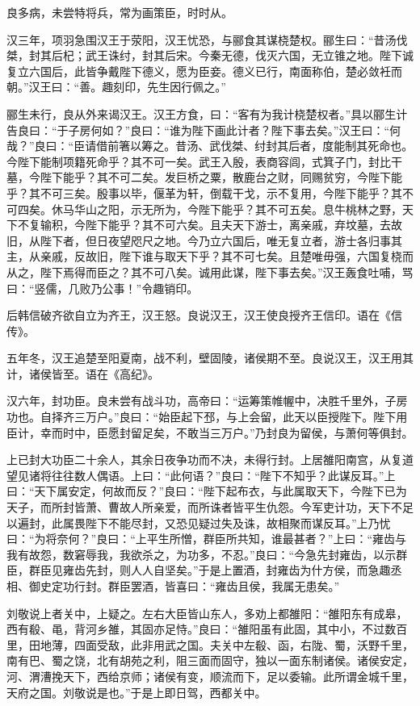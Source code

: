 \documentclass[]{article}
\begin{document}
良多病，未尝特将兵，常为画策臣，时时从。

汉三年，项羽急围汉王于荥阳，汉王忧恐，与郦食其谋桡楚权。郦生曰：``昔汤伐桀，封其后杞；武王诛纣，封其后宋。今秦无德，伐灭六国，无立锥之地。陛下诚复立六国后，此皆争戴陛下德义，愿为臣妾。德义已行，南面称伯，楚必敛衽而朝。''汉王曰：``善。趣刻印，先生因行佩之。''

郦生未行，良从外来谒汉王。汉王方食，曰：``客有为我计桡楚权者。''具以郦生计告良曰：``于子房何如？''良曰：``谁为陛下画此计者？陛下事去矣。''汉王曰：``何哉？''良曰：``臣请借前箸以筹之。昔汤、武伐桀、纣封其后者，度能制其死命也。今陛下能制项籍死命乎？其不可一矣。武王入殷，表商容闾，式箕子门，封比干墓，今陛下能乎？其不可二矣。发巨桥之粟，散鹿台之财，同赐贫穷，今陛下能乎？其不可三矣。殷事以毕，偃革为轩，倒载干戈，示不复用，今陛下能乎？其不可四矣。休马华山之阳，示无所为，今陛下能乎？其不可五矣。息牛桃林之野，天下不复输积，今陛下能乎？其不可六矣。且夫天下游士，离亲戚，弃坟墓，去故旧，从陛下者，但日夜望咫尺之地。今乃立六国后，唯无复立者，游士各归事其主，从亲戚，反故旧，陛下谁与取天下乎？其不可七矣。且楚唯毋强，六国复桡而从之，陛下焉得而臣之？其不可八矣。诚用此谋，陛下事去矣。''汉王轰食吐哺，骂曰：``竖儒，几败乃公事！''令趣销印。

后韩信破齐欲自立为齐王，汉王怒。良说汉王，汉王使良授齐王信印。语在《信传》。

五年冬，汉王追楚至阳夏南，战不利，壁固陵，诸侯期不至。良说汉王，汉王用其计，诸侯皆至。语在《高纪》。

汉六年，封功臣。良未尝有战斗功，高帝曰：``运筹策帷幄中，决胜千里外，子房功也。自择齐三万户。''良曰：``始臣起下邳，与上会留，此天以臣授陛下。陛下用臣计，幸而时中，臣愿封留足矣，不敢当三万户。''乃封良为留侯，与萧何等俱封。

上已封大功臣二十余人，其余日夜争功而不决，未得行封。上居雒阳南宫，从复道望见诸将往往数人偶语。上曰：``此何语？''良曰：``陛下不知乎？此谋反耳。''上曰：``天下属安定，何故而反？''良曰：``陛下起布衣，与此属取天下，今陛下已为天子，而所封皆萧、曹故人所亲爱，而所诛者皆平生仇怨。今军吏计功，天下不足以遍封，此属畏陛下不能尽封，又恐见疑过失及诛，故相聚而谋反耳。''上乃忧曰：``为将奈何？''良曰：``上平生所憎，群臣所共知，谁最甚者？''上曰：``雍齿与我有故怨，数窘辱我，我欲杀之，为功多，不忍。''良曰：``今急先封雍齿，以示群臣，群臣见雍齿先封，则人人自坚矣。''于是上置酒，封雍齿为什方侯，而急趣丞相、御史定功行封。群臣罢酒，皆喜曰：``雍齿且侯，我属无患矣。''

刘敬说上者关中，上疑之。左右大臣皆山东人，多劝上都雒阳：``雒阳东有成皋，西有殽、黾，背河乡雒，其固亦足恃。''良曰：``雒阳虽有此固，其中小，不过数百里，田地薄，四面受敌，此非用武之国。夫关中左殽、函，右陇、蜀，沃野千里，南有巴、蜀之饶，北有胡苑之利，阻三面而固守，独以一面东制诸侯。诸侯安定，河、渭漕挽天下，西给京师；诸侯有变，顺流而下，足以委输。此所谓金城千里，天府之国。刘敬说是也。''于是上即日驾，西都关中。
\end{document}
